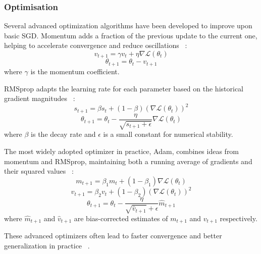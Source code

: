 \documentclass[a4paper, oneside]{discothesis}
\begin{document}
\subsubsection{Optimisation}

Several advanced optimization algorithms have been developed to improve upon basic SGD. Momentum adds a fraction of the previous update to the current one, helping to accelerate convergence and reduce oscillations ~\cite{sutskever2013importance}:
\begin{equation}
    v_{t+1} = \gamma v_t + \eta \nabla \mathcal{L}(\theta_t)
\end{equation}
\begin{equation}
    \theta_{t+1} = \theta_t - v_{t+1}
\end{equation}
where $\gamma$ is the momentum coefficient.

RMSprop adapts the learning rate for each parameter based on the historical gradient magnitudes ~\cite{kurbiel2017trainingdeepneuralnetworks}:
\begin{equation}
    s_{t+1} = \beta s_t + (1-\beta)(\nabla \mathcal{L}(\theta_t))^2
\end{equation}
\begin{equation}
    \theta_{t+1} = \theta_t - \frac{\eta}{\sqrt{s_{t+1} + \epsilon}} \nabla \mathcal{L}(\theta_t)
\end{equation}
where $\beta$ is the decay rate and $\epsilon$ is a small constant for numerical stability.

The most widely adopted optimizer in practice, Adam, combines ideas from momentum and RMSprop, maintaining both a running average of gradients and their squared values ~\cite{kingma2017adammethodstochasticoptimization}:
\begin{equation}
    m_{t+1} = \beta_1 m_t + (1-\beta_1)\nabla \mathcal{L}(\theta_t)
\end{equation}
\begin{equation}
    v_{t+1} = \beta_2 v_t + (1-\beta_2)(\nabla \mathcal{L}(\theta_t))^2
\end{equation}
\begin{equation}
    \theta_{t+1} = \theta_t - \frac{\eta}{\sqrt{\hat{v}_{t+1}} + \epsilon} \hat{m}_{t+1}
\end{equation}
where $\hat{m}_{t+1}$ and $\hat{v}_{t+1}$ are bias-corrected estimates of $m_{t+1}$ and $v_{t+1}$ respectively.

These advanced optimizers often lead to faster convergence and better generalization in practice ~\cite{ruder2017overviewgradientdescentoptimization}.
\end{document}
